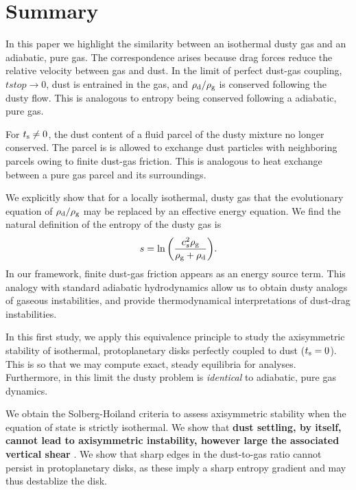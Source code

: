 \section{Summary}\label{summary}
In this paper we highlight the similarity between an isothermal 
dusty gas and an adiabatic, pure gas. The correspondence arises
because drag forces reduce the relative velocity between gas and
dust. In the limit of perfect dust-gas coupling, $tstop \to 0$,  
 dust is entrained in 
the gas, and $\rho_\mathrm{d}/\rho_\mathrm{g}$ is conserved following the dusty flow. 
This is analogous to entropy being conserved following a adiabatic,
pure gas. 

For $t_\mathrm{s}\neq 0$, the dust content of a
fluid parcel of the dusty mixture no longer conserved. The parcel is
is allowed to exchange dust particles with neighboring parcels owing
to finite dust-gas friction. This is analogous to heat exchange between a 
pure gas parcel and its surroundings. %

We explicitly show that for a locally isothermal, dusty gas that the
evolutionary equation of  $\rho_\mathrm{d}/\rho_\mathrm{g}$ may be replaced by an 
effective energy equation. We find the 
natural definition of the entropy of the dusty gas is 
\begin{align*}
  s  = \ln{\left(\frac{c_s^2\rho_\mathrm{g}}{\rho_\mathrm{g}+\rho_\mathrm{d}}\right)}.  
\end{align*}
In our framework, finite dust-gas friction appears as an energy
source term.  This analogy with standard adiabatic
hydrodynamics allow us to obtain dusty analogs of gaseous
instabilities, and provide thermodynamical interpretations of  
dust-drag instabilities. 

%
In this first study, we apply this equivalence principle to study the
axisymmetric stability of isothermal, protoplanetary disks
perfectly coupled to dust ($t_\mathrm{s}=0$). This is so that we may 
compute exact, steady equilibria for analyses. Furthermore, 
in this limit the dusty problem is \emph{identical} to adiabatic, pure
gas dynamics. 

We obtain the Solberg-Hoiland criteria to assess 
axisymmetric stability when the equation of state is strictly
isothermal. We show that {\bf dust settling, by itself, cannot lead to
  axisymmetric instability, however large the associated vertical
  shear} \citep[cf. \emph{non-axisymmetric} Kelvin-Helmholtz instabilities
  in dusty disks][]{lee10}. We show that
sharp edges in the dust-to-gas ratio cannot persist in protoplanetary
disks, as these imply a sharp entropy gradient and may thus destablize
the disk. 

